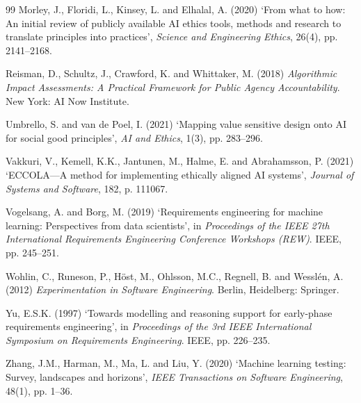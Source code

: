 \documentclass[11pt,a4paper]{article}
\begin{document}
\begin{thebibliography}{99}
Morley, J., Floridi, L., Kinsey, L. and Elhalal, A. (2020) `From what to how: An initial review of publicly available AI ethics tools, methods and research to translate principles into practices', \textit{Science and Engineering Ethics}, 26(4), pp. 2141--2168.

Reisman, D., Schultz, J., Crawford, K. and Whittaker, M. (2018) \textit{Algorithmic Impact Assessments: A Practical Framework for Public Agency Accountability}. New York: AI Now Institute.

Umbrello, S. and van de Poel, I. (2021) `Mapping value sensitive design onto AI for social good principles', \textit{AI and Ethics}, 1(3), pp. 283--296.

Vakkuri, V., Kemell, K.K., Jantunen, M., Halme, E. and Abrahamsson, P. (2021) `ECCOLA---A method for implementing ethically aligned AI systems', \textit{Journal of Systems and Software}, 182, p. 111067.

Vogelsang, A. and Borg, M. (2019) `Requirements engineering for machine learning: Perspectives from data scientists', in \textit{Proceedings of the IEEE 27th International Requirements Engineering Conference Workshops (REW)}. IEEE, pp. 245--251.

Wohlin, C., Runeson, P., H\"{o}st, M., Ohlsson, M.C., Regnell, B. and Wessl\'{e}n, A. (2012) \textit{Experimentation in Software Engineering}. Berlin, Heidelberg: Springer.

Yu, E.S.K. (1997) `Towards modelling and reasoning support for early-phase requirements engineering', in \textit{Proceedings of the 3rd IEEE International Symposium on Requirements Engineering}. IEEE, pp. 226--235.

Zhang, J.M., Harman, M., Ma, L. and Liu, Y. (2020) `Machine learning testing: Survey, landscapes and horizons', \textit{IEEE Transactions on Software Engineering}, 48(1), pp. 1--36.

\end{thebibliography}
\end{document}
